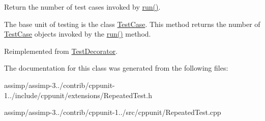 Return the number of test cases invoked by \hyperlink{class_repeated_test_a6faffcd29b619305a75dd4c1995beaad}{run()}. 

The base unit of testing is the class \hyperlink{class_test_case}{Test\+Case}. This method returns the number of \hyperlink{class_test_case}{Test\+Case} objects invoked by the \hyperlink{class_repeated_test_a6faffcd29b619305a75dd4c1995beaad}{run()} method. 

Reimplemented from \hyperlink{class_test_decorator_add3b489dfb3331eba0aee7e06b03548b}{Test\+Decorator}.



The documentation for this class was generated from the following files\+:\begin{DoxyCompactItemize}
\item 
assimp/assimp-\/3../contrib/cppunit-\/1../include/cppunit/extensions/Repeated\+Test.\+h\item 
assimp/assimp-\/3../contrib/cppunit-\/1../src/cppunit/Repeated\+Test.\+cpp\end{DoxyCompactItemize}
